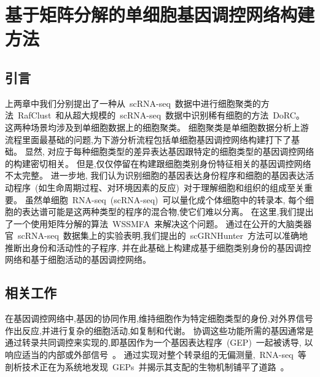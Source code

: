 \section{基于矩阵分解的单细胞基因调控网络构建方法}
\label{sec:scgrnhunter}

\subsection{引言}

上两章中我们分别提出了一种从~scRNA-seq~数据中进行细胞聚类的方法~RafClust~和从超大规模的~scRNA-seq~数据中识别稀有细胞的方法~DoRC。
这两种场景均涉及到单细胞数据上的细胞聚类。
细胞聚类是单细胞数据分析上游流程里面最基础的问题,为下游分析流程包括单细胞基因调控网络构建打下了基础。
显然, 对应于每种细胞类型的差异表达基因跟特定的细胞类型的基因调控网络的构建密切相关。
但是,仅仅停留在构建跟细胞类别身份特征相关的基因调控网络不太完整。
进一步地,
我们认为识别细胞的基因表达身份程序和细胞的基因表达活动程序~(如生命周期过程、对环境因素的反应)~对于理解细胞和组织的组成至关重要。
虽然单细胞~RNA-seq~(scRNA-seq)~可以量化成个体细胞中的转录本,
每个细胞的表达谱可能是这两种类型的程序的混合物,使它们难以分离。
在这里,我们提出了一个使用矩阵分解的算法~WSSMFA~来解决这个问题。
通过在公开的大脑类器官~scRNA-seq~数据集上的实验表明,我们提出的~scGRNHunter~方法可以准确地推断出身份和活动性的子程序, 
并在此基础上构建成基于细胞类别身份的基因调控网络和基于细胞活动的基因调控网络。


\subsection{相关工作}
在基因调控网络中,基因的协同作用,维持细胞作为特定细胞类型的身份,对外界信号作出反应,并进行复杂的细胞活动,如复制和代谢。
协调这些功能所需的基因通常是通过转录共同调控来实现的,即基因作为一个基因表达程序~(GEP)~一起被诱导,
以响应适当的内部或外部信号~\cite{eisen1998cluster,segal2003module}。
通过实现对整个转录组的无偏测量,~RNA-seq~等剖析技术正在为系统地发现~GEPs~并揭示其支配的生物机制铺平了道路~\cite{liberzon2015molecular}。

